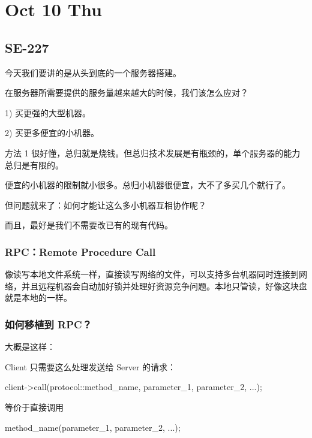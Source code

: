 \documentclass[
]{article}
\date{}
\newenvironment{Shaded}{}{}
\newcommand{\NormalTok}[1]{#1}
\begin{document}
\hypertarget{header-n0}{%
\section{Oct 10 Thu}\label{header-n0}}

\hypertarget{header-n2}{%
\subsection{SE-227}\label{header-n2}}

今天我们要讲的是从头到底的一个服务器搭建。

在服务器所需要提供的服务量越来越大的时候，我们该怎么应对？

1) 买更强的大型机器。

2) 买更多便宜的小机器。

方法 1
很好懂，总归就是烧钱。但总归技术发展是有瓶颈的，单个服务器的能力总归是有限的。

便宜的小机器的限制就小很多。总归小机器很便宜，大不了多买几个就行了。

但问题就来了：如何才能让这么多小机器互相协作呢？

而且，最好是我们不需要改已有的现有代码。

\hypertarget{header-n11}{%
\subsubsection{RPC：Remote Procedure Call}\label{header-n11}}

像读写本地文件系统一样，直接读写网络的文件，可以支持多台机器同时连接到网络，并且远程机器会自动加好锁并处理好资源竞争问题。本地只管读，好像这块盘就是本地的一样。

\hypertarget{header-n13}{%
\subsubsection{如何移植到 RPC？}\label{header-n13}}

大概是这样：

Client 只需要这么处理发送给 Server 的请求：

\begin{Shaded}
\begin{Highlighting}[]
\NormalTok{client->call(protocol::method_name, parameter_1, parameter_2, ...);}
\end{Highlighting}
\end{Shaded}

等价于直接调用

\begin{Shaded}
\begin{Highlighting}[]
\NormalTok{method_name(parameter_1, parameter_2, ...);}
\end{Highlighting}
\end{Shaded}
\end{document}
